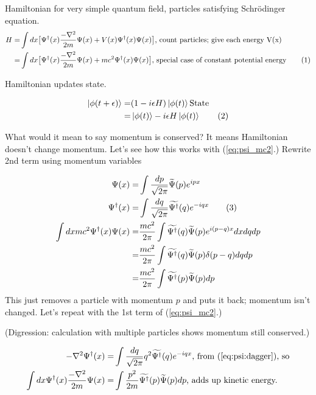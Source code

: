 \documentclass[]{article}
\newcommand\numberthis{\addtocounter{equation}{1}\tag{\theequation}}
\begin{document}
Hamiltonian for very simple quantum field,  particles satisfying Schr\"odinger equation.
\begin{align*}
H =& \int dx \big[ \Psi^\dagger(x) \frac{- \nabla^2}{2m} \Psi(x) + V(x) \Psi^\dagger(x) \Psi(x) \big] \text{, count particles; give each energy V(x)}\\
=&\int dx \big[\Psi^\dagger(x) \frac{- \nabla^2}{2m} \Psi(x) + mc^2 \Psi^\dagger(x) \Psi(x)\big] \text{, special case of constant potential energy} \numberthis\label{eq:psi_mc2}
\end{align*}

Hamiltonian updates state.

\begin{align*}
\ket{\phi(t+\epsilon)} =& (1-i \epsilon H) \ket{\phi(t)} \text{State}\\
=& \ket{\phi(t)} -i \epsilon H \ket{\phi(t)} \numberthis \label{eq:update:state}
\end{align*}

What would it mean to say momentum is conserved? It means Hamiltonian doesn't change momentum. Let's see how this works with (\ref{eq:psi_mc2}.) Rewrite 2nd term  using momentum variables

\begin{align*}
\Psi(x) =& \int \frac{dp}{\sqrt{2\pi}} \widetilde{\Psi}(p) e^{ipx}\\
\Psi^\dagger (x) =& \int \frac{dq}{\sqrt{2\pi}} \widetilde{\Psi^\dagger}(q) e^{-iqx} \numberthis \label{eq:psi:dagger}\\
\int dx mc^2 \Psi^\dagger(x) \Psi(x) =& \frac{mc^2}{2 \pi} \int \widetilde{\Psi^\dagger}(q) \widetilde{\Psi}(p) e^{i(p-q)x} dx dq dp\\
=& \frac{mc^2}{2 \pi} \int \widetilde{\Psi^\dagger}(q) \widetilde{\Psi}(p) \delta(p-q) dq dp\\
=& \frac{mc^2}{2 \pi} \int \widetilde{\Psi^\dagger}(p) \widetilde{\Psi}(p) dp
\end{align*}
This just removes a particle with momentum $p$ and puts it back; momentum isn't changed. Let's repeat with the 1st term of (\ref{eq:psi_mc2}.)

(Digression: calculation with multiple particles shows momentum still conserved.)

\begin{align*}
- \nabla^2 \Psi^\dagger (x) =& \int \frac{dq}{\sqrt{2\pi}} q^2 \widetilde{\Psi^\dagger}(q) e^{-iqx}\text{, from (\ref{eq:psi:dagger}), so}\\
\int dx \Psi^\dagger(x) \frac{- \nabla^2}{2m} \Psi(x)=& \int \frac{ p^2}{2m} \widetilde{\Psi^\dagger}(p) \widetilde{\Psi}(p) dp \text{, adds up kinetic energy.}
\end{align*}
\end{document}

